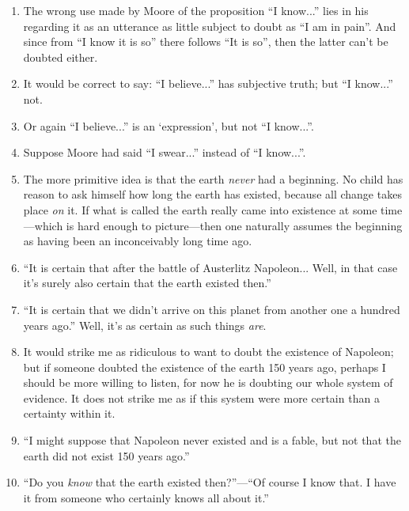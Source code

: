 \documentclass{book}
\begin{document}
\begin{enumerate}
\item
The wrong use made by Moore of the proposition ``I know...'' lies in his
regarding it as an utterance as little subject to doubt as ``I am in pain''.
And since from ``I know it is so'' there follows ``It is so'', then the latter
can't be doubted either.

\item
It would be correct to say: ``I believe...'' has subjective truth; but ``I
know...'' not.

\item
Or again ``I believe...'' is an `expression', but not ``I know...''.

\item
Suppose Moore had said ``I swear...'' instead of ``I know...''.

\item
The more primitive idea is that the earth \emph{never} had a beginning. No
child has reason to ask himself how long the earth has existed, because all
change takes place \emph{on} it. If what is called the earth really came into
existence at some time---which is hard enough to picture---then one naturally
assumes the beginning as having been an inconceivably long time ago.

\item
``It is certain that after the battle of Austerlitz Napoleon... Well, in that
case it's surely also certain that the earth existed then.''

\item
``It is certain that we didn't arrive on this planet from another one a hundred
years ago.'' Well, it's as certain as such things \emph{are}.

\item
It would strike me as ridiculous to want to doubt the existence of Napoleon;
but if someone doubted the existence of the earth 150 years ago, perhaps I
should be more willing to listen, for now he is doubting our whole system of
evidence. It does not strike me as if this system were more certain than a
certainty within it.

\item
``I might suppose that Napoleon never existed and is a fable, but not that the
earth did not exist 150 years ago.''

\item
``Do you \emph{know} that the earth existed then?''---``Of course I know that.
I have it from someone who certainly knows all about it.''


\end{enumerate}
\end{document}
